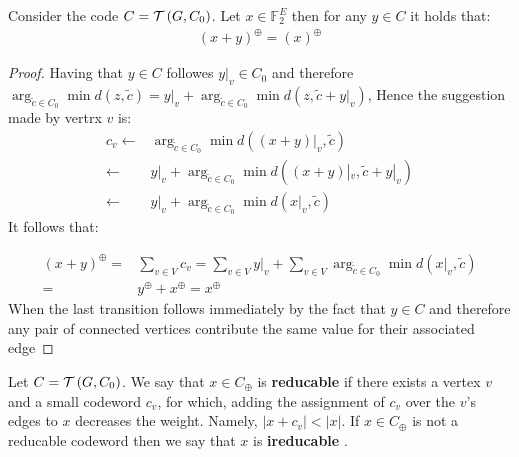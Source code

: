 \documentclass[manuscript,screen,review]{acmart}
\begin{document}
\begin{lemma} \label{lemma:lin} Consider the code $C = \mathcal{T}\left( G, C_0 \right)$. Let $ x \in \mathbb{F}_{2}^{E}$ then for any $ y \in C$ it holds that: 
  \begin{equation*}
    \begin{split}
      \left( x + y  \right)^{\oplus} = \left( x  \right)^{\oplus} 
    \end{split}
  \end{equation*}
\end{lemma}
  \begin{proof} Having that $y \in C$ followes $y|_v \in C_{0}$ and therefore $\arg_{ \tilde{c} \in C_{0}} \min{ d( z  , \tilde{c} ) } = y|_{v} + \arg_{ \tilde{c} \in C_{0}} \min{ d( z, \tilde{c} + y|_{v} ) } $, Hence the suggestion made by vertrx $v$ is: 
  \begin{equation*}
    \begin{split}
      c_{v}\leftarrow &  \arg_{ \tilde{c} \in C_{0}} \min{ d( (x+y)|_{v}  , \tilde{c} ) } \\
      \leftarrow &  y|_{v} +  \arg_{ \tilde{c} \in C_{0}} \min{ d( (x+y)|_{v}  , \tilde{c} + y|_{v} ) } \\
      \leftarrow &  y|_{v} +  \arg_{ \tilde{c} \in C_{0}} \min{ d( x|_{v} , \tilde{c} ) } 
    \end{split}
  \end{equation*}
  It follows that: 

  \begin{equation*}
    \begin{split}
      \left( x + y \right)^{\oplus} =& \sum_{v\in V}{c_{v}} = \sum_{v \in V}{y|_{v}} + \sum_{v\in V}{ \arg_{ \tilde{c} \in C_{0}} \min{ d( x|_{v} , \tilde{c} ) } } \\ 
      =& y^{\oplus} + x^{\oplus} = x^{\oplus}
    \end{split}
  \end{equation*}
  When the last transition follows immediately by the fact that $y \in C$ and therefore any pair of connected vertices contribute the same value for their associated edge \end{proof}

  \begin{definition} Let $C = \mathcal{T}\left( G, C_0 \right)$. We say that $x \in C_{\oplus}$ is \textbf{reducable} if there exists a vertex $v$ and a small codeword $c_v$, for which, adding the assignment of $c_v$ over the $v$'s edges to $x$ decreases the weight. Namely, $|x + c_{v}| < |x|$. If $x \in C_{\oplus}$ is not a reducable codeword then we say that $x$ is \textbf{ireducable} \label{ire}. \end{definition}
\end{document}
